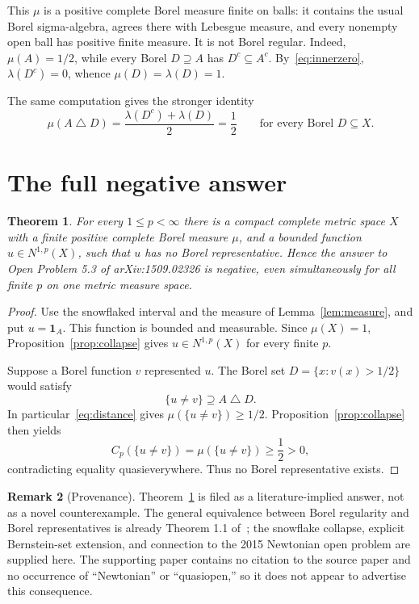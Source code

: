 \documentclass[11pt]{amsart}
\newtheorem{theorem}{Theorem}
\theoremstyle{definition}
\newtheorem{remark}[theorem]{Remark}
\newcommand{\Cp}{C_p}
\newcommand{\Np}{N^{1,p}}
\begin{document}
This $\mu$ is a positive complete Borel measure finite on balls: it contains
the usual Borel sigma-algebra, agrees there with Lebesgue measure, and every
nonempty open ball has positive finite measure.  It is not Borel regular.
Indeed, $\mu(A)=1/2$, while every Borel $D\supseteq A$ has
$D^c\subseteq A^c$.  By~\eqref{eq:innerzero}, $\lambda(D^c)=0$, whence
$\mu(D)=\lambda(D)=1$.

The same computation gives the stronger identity
\begin{equation}\label{eq:distance}
 \mu(A\mathbin\triangle D)
 =\frac{\lambda(D^c)+\lambda(D)}2=\frac12
 \qquad\text{for every Borel }D\subseteq X.
\end{equation}

\section{The full negative answer}

\begin{theorem}\label{thm:main}
For every $1\le p<\infty$ there is a compact complete metric space $X$ with
a finite positive complete Borel measure $\mu$, and a bounded function
$u\in\Np(X)$, such that $u$ has no Borel representative.  Hence the answer
to Open Problem 5.3 of arXiv:1509.02326 is negative, even simultaneously for
all finite $p$ on one metric measure space.
\end{theorem}

\begin{proof}
Use the snowflaked interval and the measure of
Lemma~\ref{lem:measure}, and put $u=\mathbf1_A$.  This function is bounded
and measurable.  Since $\mu(X)=1$, Proposition~\ref{prop:collapse} gives
$u\in\Np(X)$ for every finite $p$.

Suppose a Borel function $v$ represented $u$.  The Borel set
$D=\{x:v(x)>1/2\}$ would satisfy
\[
 \{u\ne v\}\supseteq A\mathbin\triangle D.
\]
In particular~\eqref{eq:distance} gives
$\mu(\{u\ne v\})\ge1/2$.  Proposition~\ref{prop:collapse} then yields
\[
 \Cp(\{u\ne v\})=\mu(\{u\ne v\})\ge\frac12>0,
\]
contradicting equality quasieverywhere.  Thus no Borel representative exists.
\end{proof}

\begin{remark}[Provenance]
Theorem~\ref{thm:main} is filed as a literature-implied answer, not as a
novel counterexample.  The general equivalence between Borel regularity and
Borel representatives is already Theorem 1.1 of~\cite{support}; the
snowflake collapse, explicit Bernstein-set extension, and connection to the
2015 Newtonian open problem are supplied here.  The supporting paper contains
no citation to the source paper and no occurrence of ``Newtonian'' or
``quasiopen,'' so it does not appear to advertise this consequence.
\end{remark}
\end{document}
